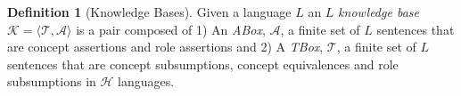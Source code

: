 \documentclass[letterpaper]{article} %
\theoremstyle{definition}
\theoremstyle{definition}
\newtheorem{definition}{Definition}
\theoremstyle{definition}
\theoremstyle{definition}
\theoremstyle{definition}
\begin{document}
\begin{definition}[Knowledge Bases]
    Given a language $L$ an $L$ \textit{knowledge base} $\mathcal{K} = \langle\mathcal{T}, \mathcal{A}\rangle$ is a pair composed of 1) An \textit{ABox}, $\mathcal{A}$, a finite set of $L$ sentences that are concept assertions and role assertions and 2) A {\it TBox}, $\mathcal{T}$, a finite set of $L$ sentences that are concept subsumptions, concept equivalences and role subsumptions in $\mathcal{H}$ languages.
\end{definition}

\end{document}
